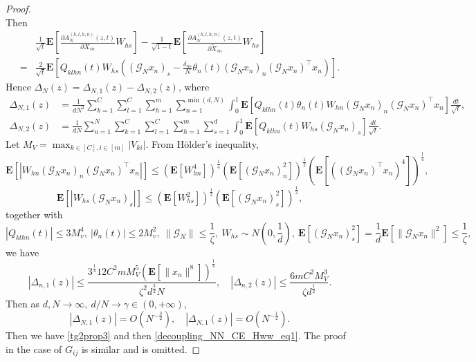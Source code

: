\documentclass{article}
\newcommand{\E}{\mathbf{E}}
\newcommand\ml{\mathcal}
\newcommand\pl{\partial}
\newcommand{\wt}{\widetilde}
\newcommand{\rw}{\rightarrow}
\newcommand{\1}{^{(1)}}
\newcommand{\2}{^{(2)}}
\renewcommand{\l}{\left}
\renewcommand{\r}{\right}
\newcommand{\bea}{\begin{equation}\begin{aligned}}
\newcommand{\eea}{\end{aligned}\end{equation}}
\begin{document}
\begin{proof}
$$    $$
    Then
    \bea
    &\frac{1}{\sqrt{t}}\E\l[\frac{\pl A^{(k,l,h,n)}_N(z,t)}{\pl X_{sn}}W_{hs}\r]-\frac{1}{\sqrt{1-t}}\E\l[\frac{\pl A^{(k,l,h,n)}_N(z,t)}{\pl \wt{X}_{sn}}W_{hs}\r]\\
    =&\frac{2}{\sqrt{t}}\E\l[Q_{klhn}(t)W_{hs}\l((\ml{G}_Nx_n)_s-\frac{\delta_{ns}}{N}\theta_n(t)(\ml{G}_Nx_n)_n(\ml{G}_Nx_n)^\top x_n\r)\r].
    \eea
    Hence $\Delta_N(z)=\Delta_{N,1}(z)-\Delta_{N,2}(z)$, where
    \bea
    \Delta_{N,1}(z)&=\frac{1}{dN^2}\sum_{k=1}^C\sum_{l=1}^C\sum_{h=1}^m\sum_{n=1}^{\min(d,N)}\int_0^1\E\l[Q_{klhn}(t)\theta_n(t)W_{hn}(\ml{G}_Nx_n)_n(\ml{G}_Nx_n)^\top x_n\r]\frac{dt}{\sqrt{t}},\\
    \Delta_{N,2}(z)&=\frac{1}{dN}\sum_{n=1}^N\sum_{k=1}^C\sum_{l=1}^C\sum_{h=1}^m\sum_{s=1}^d\int_0^1\E\l[Q_{klhn}(t)W_{hs}(\ml{G}_Nx_n)_s\r]\frac{dt}{\sqrt{t}}.
    \eea
    Let $M_V=\max_{k\in [C],i\in [m]}|V_{ki}|$. From Hölder's inequality,
    $$
    \E[|W_{hn}(\ml{G}_Nx_n)_n(\ml{G}_Nx_n)^\top x_n|]\leq \l(\E[W_{hn}^4]\r)^{\frac{1}{4}}\l(\E[(\ml{G}_Nx_n)_n^2]\r)^\frac{1}{2}\l(\E[((\ml{G}_Nx_n)^\top x_n)^4]\r)^\frac{1}{4},
    $$
    $$
    \E[|W_{hs}(\ml{G}_Nx_n)_s|]\leq \l(\E[W_{hs}^2]\r)^{\frac{1}{2}}\l(\E[(\ml{G}_Nx_n)_s^2]\r)^{\frac{1}{2}},
    $$
    together with 
    $$|Q_{klhn}(t)|\leq 3M_v^4,\ |\theta_n(t)|\leq 2M_v^2,\ \|\ml{G}_N\|\leq \frac{1}{\zeta},\ W_{hs}\sim N(0,\frac{1}{d}),\ \E[(\ml{G}_Nx_n)_s^2]=\frac{1}{d}\E[\|\ml{G}_Nx_n\|^2]\leq \frac{1}{\zeta},$$
    we have
    $$
    |\Delta_{n,1}(z)|\leq \frac{3^{\frac{1}{4}}12C^2mM_V^5\l(\E[\|x_n\|^8]\r)^\frac{1}{4}}{\zeta^2d^\frac{3}{2}N},\quad |\Delta_{n,2}(z)|\leq \frac{6mC^2M_V^3}{\zeta d^{\frac{1}{2}}}.
    $$
    Then as $d,N\rw\infty,\ d/N\rw \gamma\in (0,+\infty)$,
    $$
    |\Delta_{N,1}(z)|=O\l(N^{-\frac{3}{2}}\r),\quad |\Delta_{N,1}(z)|=O\l(N^{-\frac{1}{2}}\r).
    $$
    Then we have \eqref{tg2prop3} and then \eqref{decoupling_NN_CE_Hww_eq1}. The proof in the case of $G_{ij}$ is similar and is omitted.
\end{proof}
\end{document}
